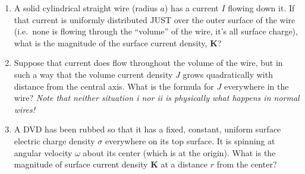 \documentclass[11pt]{article}
\def\tightlist{}
\begin{document}
\begin{enumerate}
\def\labelenumi{\arabic{enumi}.}
\tightlist
\item
  A solid cylindrical straight wire (radius \(a\)) has a current \(I\)
  flowing down it. If that current is uniformly distributed JUST over
  the outer surface of the wire (i.e.~none is flowing through the
  ``volume'' of the wire, it's all surface charge), what is the
  magnitude of the surface current density, \(\mathbf{K}\)?
\item
  Suppose that current does flow throughout the volume of the wire, but
  in such a way that the volume current density \(J\) grows
  quadratically with distance from the central axis. What is the formula
  for \(J\) everywhere in the wire? \emph{Note that neither situation i
  nor ii is physically what happens in normal wires!}
\item
  A DVD has been rubbed so that it has a fixed, constant, uniform
  surface electric charge density \(\sigma\) everywhere on its top
  surface. It is spinning at angular velocity \(\omega\) about its
  center (which is at the origin). What is the magnitude of surface
  current density \(\mathbf{K}\) at a distance \(r\) from the center?
\end{enumerate}
\end{document}
